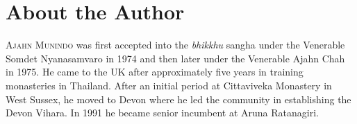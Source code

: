 \chapter{About the Author}

\textsc{Ajahn Munindo} was first accepted into the \emph{bhikkhu} sangha under the
Venerable Somdet Nyanasamvaro in 1974 and then later under the Venerable Ajahn
Chah in 1975. He came to the UK after approximately five years in training
monasteries in Thailand. After an initial period at Cittaviveka Monastery in
West Sussex, he moved to Devon where he led the community in establishing the
Devon Vihara. In 1991 he became senior incumbent at Aruna Ratanagiri.

